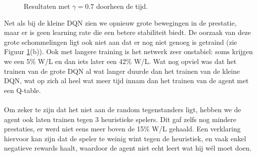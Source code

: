 \documentclass[11pt]{article}
\begin{document}
\begin{figure}[H]
    \centering
    \qquad
    \caption{Resultaten met $\gamma = 0.7$ doorheen de tijd.}
    \label{fig:results_bigdqn_in_time}
\end{figure}
\noindent Net als bij de kleine DQN zien we opnieuw grote bewegingen in de prestatie, maar er is geen learning rate die een betere stabiliteit biedt. De oorzaak van deze grote schommelingen ligt ook niet aan dat er nog niet genoeg is getraind (zie Figuur \ref{fig:results_bigdqn_in_time}(b)). Ook met langere training is het netwerk zeer onstabiel: soms krijgen we een 5\% W/L en dan iets later een 42\% W/L. Wat nog opviel was dat het trainen van de grote DQN al wat langer duurde dan het trainen van de kleine DQN, wat op zich al heel wat meer tijd innam dan het trainen van de agent met een Q-table.\\\\
Om zeker te zijn dat het niet aan de random tegenstanders ligt, hebben we de agent ook laten trainen tegen 3 heuristieke spelers. Dit gaf zelfs nog mindere prestaties, er werd niet eens meer boven de 15\% W/L gehaald. Een verklaring hiervoor kan zijn dat de speler te weinig wint tegen de heuristiek, en vaak enkel negatieve rewards haalt, waardoor de agent niet echt leert wat hij wél moet doen.\\\\
\end{document}
